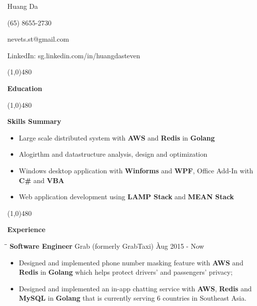 \documentclass{article}
\begin{document}
\centerline{{\Huge \sc Huang Da} }
\centerline{(65) 8655-2730}
\centerline{nevets.st@gmail.com}
\centerline{LinkedIn: sg.linkedin.com/in/huangdasteven}

\noindent

\centerline{\line(1,0){480}}

\medskip

\centerline {\Large \bf Education}

\smallskip


\centerline{\line(1,0){480}}

\medskip

\centerline {\Large \bf {Skills Summary}}

\vspace{-6pt}\smallskip

\begin{itemize}[leftmargin=*]
  \item Large scale distributed system with {\bf AWS} and {\bf Redis} in {\bf Golang} \vspace{-6pt}
  \item Alogirthm and datastructure analysis, design and optimization \vspace{-6pt}
  \item Windows desktop application with {\bf Winforms} and {\bf WPF}, Office Add-In with {\bf C\#}  and {\bf VBA}\vspace{-6pt}
  \item Web application development using {\bf LAMP Stack} and {\bf MEAN Stack} \vspace{-6pt}
\end{itemize}

\centerline{\line(1,0){480}}

\medskip

\centerline {\Large \bf Experience}

\medskip


\begin{tabbing}
\hspace{2.35in}\= \hspace{2.6in}\= \kill
{\bf Software Engineer} \> Grab (formerly GrabTaxi) \`Aug 2015 - Now\
\end{tabbing}

\begin{itemize}
    \item Designed and implemented phone number masking feature with {\bf AWS} and {\bf Redis} in {\bf Golang} which helps protect drivers' and passengers' privacy; \vspace{-6pt}
    \item Designed and implemented an in-app chatting service with {\bf AWS}, {\bf Redis} and {\bf MySQL} in {\bf Golang} that is currently serving 6 countries in Southeast Asia.
\end{itemize}
\end{document}
